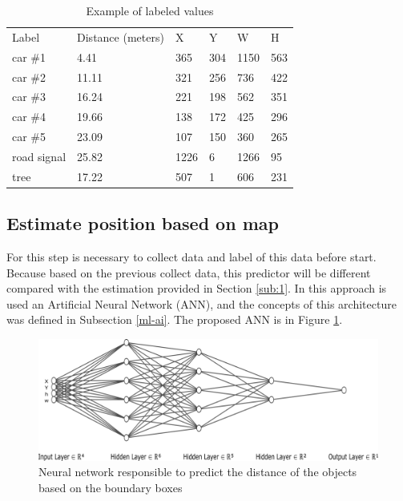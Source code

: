 \begin{table}[H]
\centering
\caption{Example of labeled values}
\begin{tabular}{llllll} 
\hline
Label        & Distance (meters) & X    & Y   & W    & H   \\
car \#1         & 4.41     & 365  & 304 & 1150 & 563  \\
car \#2        & 11.11    & 321  & 256 & 736  & 422  \\
car \#3        & 16.24    & 221  & 198 & 562  & 351  \\
car \#4        & 19.66    & 138  & 172 & 425  & 296  \\
car \#5        & 23.09    & 107  & 150 & 360  & 265  \\
road signal & 25.82    & 1226 & 6   & 1266 & 95   \\
tree        & 17.22    & 507  & 1   & 606  & 231  \\
\hline
\end{tabular}
 \label{tab:output_table}
\end{table}

\subsection{Estimate position based on map}

For this step is necessary to collect data and label of this data before start. Because based on the previous collect data, this predictor will be different compared with the estimation provided in Section \ref{sub:1}. In this approach is used an Artificial Neural Network (ANN), and the concepts of this architecture was defined in 
Subsection \ref{ml-ai}. The proposed ANN is in Figure \ref{fig:rede_neural}.


\begin{figure}[H]
\centering
\includegraphics[width=\textwidth]{imagens/nn.png}
\caption{Neural network responsible to predict the distance of the objects based on the boundary boxes}
\label{fig:rede_neural}
\end{figure}


